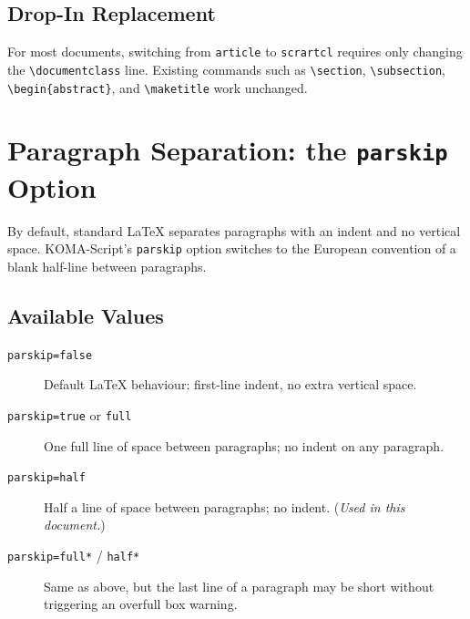 \documentclass[
    12pt,               %
    a4paper,            %
    parskip=half,       %
    headings=small,     %
    DIV=12              %
]{scrartcl}
\begin{document}
\subsection{Drop-In Replacement}

For most documents, switching from \texttt{article} to \texttt{scrartcl}
requires only changing the \verb|\documentclass| line. Existing commands
such as \verb|\section|, \verb|\subsection|, \verb|\begin{abstract}|, and
\verb|\maketitle| work unchanged.


\section{Paragraph Separation: the \texttt{parskip} Option}
\label{sec:parskip}

By default, standard \LaTeX{} separates paragraphs with an indent and no
vertical space. KOMA-Script's \texttt{parskip} option switches to the
European convention of a blank half-line between paragraphs.

\subsection{Available Values}

\begin{description}
    \item[\texttt{parskip=false}]
        Default \LaTeX{} behaviour: first-line indent, no extra vertical space.
    \item[\texttt{parskip=true} or \texttt{full}]
        One full line of space between paragraphs; no indent on any paragraph.
    \item[\texttt{parskip=half}]
        Half a line of space between paragraphs; no indent. (\emph{Used in
        this document.})
    \item[\texttt{parskip=full*} / \texttt{half*}]
        Same as above, but the last line of a paragraph may be short without
        triggering an overfull box warning.
\end{description}
\end{document}
